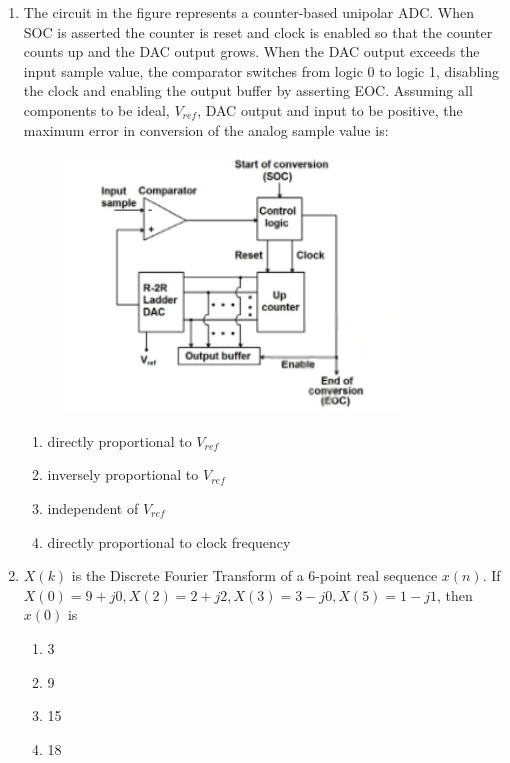 \documentclass[journal,12pt,onecolumn]{IEEEtran}
\theoremstyle{remark}
\begin{document}
\begin{enumerate}
    \item The circuit in the figure represents a counter-based unipolar ADC. When SOC is asserted the counter is reset and clock is enabled so that the counter counts up and the DAC output grows. When the DAC output exceeds the input sample value, the comparator switches from logic 0 to logic 1, disabling the clock and enabling the output buffer by asserting EOC. Assuming all components to be ideal, $V_{ref}$, DAC output and input to be positive, the maximum error in conversion of the analog sample value is:
    \begin{figure}[H]
        \centering
        \includegraphics[width=0.6\columnwidth]{q43}
        \caption*{}
        \label{fig:placeholder}
    \end{figure}
    \begin{enumerate}
        \item directly proportional to $V_{ref}$
        \item inversely proportional to $V_{ref}$
        \item independent of $V_{ref}$
        \item directly proportional to clock frequency
    \end{enumerate}

    \vspace{0.5cm}

    \item $X(k)$ is the Discrete Fourier Transform of a 6-point real sequence $x(n)$. If $X(0) = 9+j0, X(2) = 2+j2, X(3) = 3-j0, X(5) = 1-j1$, then $x(0)$ is
    \begin{multicols}{4}
        \begin{enumerate}
            \item 3
            \item 9
            \item 15
            \item 18
        \end{enumerate}
    \end{multicols}


\end{enumerate}
\end{document}
